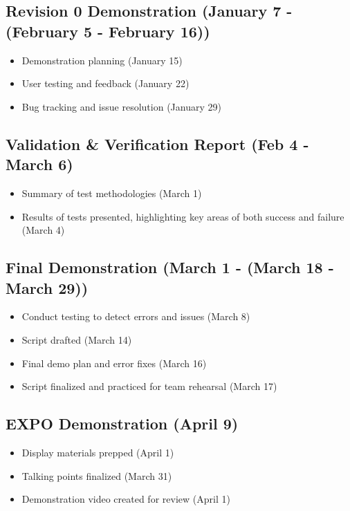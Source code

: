 \documentclass{article}
\begin{document}
	\subsection{Revision 0 Demonstration (January 7 - (February 5 - February 16))}
	\begin{itemize}
		\item Demonstration planning (January 15)
		\item User testing and feedback (January 22)
		\item Bug tracking and issue resolution (January 29)
	\end{itemize}

	\subsection{Validation \& Verification Report (Feb 4 - March 6)}
	\begin{itemize}
		\item Summary of test methodologies (March 1)
		\item Results of tests presented, highlighting key areas of both success and failure (March 4)
	\end{itemize}

	\subsection{Final Demonstration (March 1 - (March 18 - March 29))}
	\begin{itemize}
		\item Conduct testing to detect errors and issues (March 8)
		\item Script drafted (March 14)
		\item Final demo plan and error fixes (March 16)
		\item Script finalized and practiced for team rehearsal (March 17)
	\end{itemize}

	\subsection{EXPO Demonstration (April 9)}
	\begin{itemize}
		\item Display materials prepped (April 1)
		\item Talking points finalized (March 31)
		\item Demonstration video created for review (April 1)
	\end{itemize}
\end{document}
